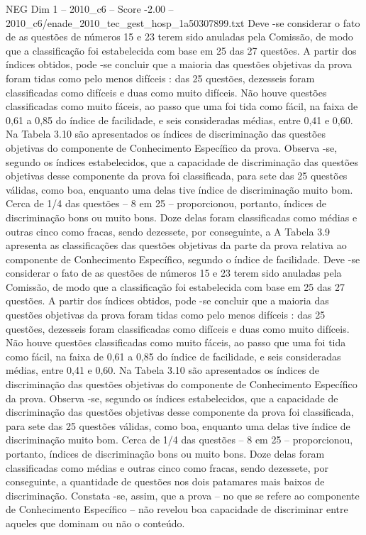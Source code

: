 \begin{textsample}{NEG Dim 1 – 2010\_c6 – Score -2.00 – 2010\_c6/enade\_2010\_tec\_gest\_hosp\_1a50307899.txt}
Deve -se considerar o fato de as questões de números 15 e 23 terem sido anuladas pela Comissão, de modo que a classificação foi estabelecida com base em 25 das 27 questões.
A partir dos índices obtidos, pode -se concluir que a maioria das questões objetivas da prova foram tidas como pelo menos difíceis : das 25 questões, dezesseis foram classificadas como difíceis e duas como muito difíceis.
Não houve questões classificadas como muito fáceis, ao passo que uma foi tida como fácil, na faixa de 0,61 a 0,85 do índice de facilidade, e seis consideradas médias, entre 0,41 e 0,60.
Na Tabela 3.10 são apresentados os índices de discriminação das questões objetivas do componente de Conhecimento Específico da prova.
Observa -se, segundo os índices estabelecidos, que a capacidade de discriminação das questões objetivas desse componente da prova foi classificada, para sete das 25 questões válidas, como boa, enquanto uma delas tive índice de discriminação muito bom.
Cerca de 1/4 das questões – 8 em 25 – proporcionou, portanto, índices de discriminação bons ou muito bons.
Doze delas foram classificadas como médias e outras cinco como fracas, sendo dezessete, por conseguinte, a A Tabela 3.9 apresenta as classificações das questões objetivas da parte da prova relativa ao componente de Conhecimento Específico, segundo o índice de facilidade.
Deve -se considerar o fato de as questões de números 15 e 23 terem sido anuladas pela Comissão, de modo que a classificação foi estabelecida com base em 25 das 27 questões.
A partir dos índices obtidos, pode -se concluir que a maioria das questões objetivas da prova foram tidas como pelo menos difíceis : das 25 questões, dezesseis foram classificadas como difíceis e duas como muito difíceis.
Não houve questões classificadas como muito fáceis, ao passo que uma foi tida como fácil, na faixa de 0,61 a 0,85 do índice de facilidade, e seis consideradas médias, entre 0,41 e 0,60.
Na Tabela 3.10 são apresentados os índices de discriminação das questões objetivas do componente de Conhecimento Específico da prova.
Observa -se, segundo os índices estabelecidos, que a capacidade de discriminação das questões objetivas desse componente da prova foi classificada, para sete das 25 questões válidas, como boa, enquanto uma delas tive índice de discriminação muito bom.
Cerca de 1/4 das questões – 8 em 25 – proporcionou, portanto, índices de discriminação bons ou muito bons.
Doze delas foram classificadas como médias e outras cinco como fracas, sendo dezessete, por conseguinte, a quantidade de questões nos dois patamares mais baixos de discriminação.
Constata -se, assim, que a prova – no que se refere ao componente de Conhecimento Específico – não revelou boa capacidade de discriminar entre aqueles que dominam ou não o conteúdo.

\end{textsample}
